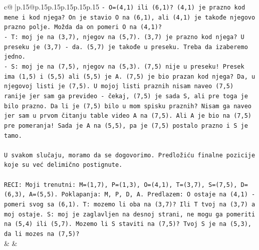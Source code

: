 \documentclass{article}
\begin{document}
{\begin{supertabular}{c@{$\;$}|p{.15\linewidth}@{}p{.15\linewidth}p{.15\linewidth}p{.15\linewidth}p{.15\linewidth}p{.15\linewidth}}
{{{\texttt{{-} O=(4,1) ili (6,1)? (4,1) je prazno kod mene i kod njega? On je stavio O na (6,1), ali (4,1) je takođe njegovo prazno polje. Možda da on pomeri O na (4,1)?} \\
\texttt{{-} T: moj je na (3,7), njegov na (5,7). (3,7) je prazno kod njega? U preseku je (3,7) {-} da. (5,7) je takođe u preseku. Treba da izaberemo jedno.} \\
\texttt{{-} S: moj je na (7,5), njegov na (5,3). (7,5) nije u preseku! Presek ima (1,5) i (5,5) ali (5,5) je A. (7,5) je bio prazan kod njega? Da, u njegovoj listi je (7,5). U mojoj listi praznih nisam naveo (7,5) ranije jer sam ga prevideo {-} čekaj, (7,5) je sada S, ali pre toga je bilo prazno. Da li je (7,5) bilo u mom spisku praznih? Nisam ga naveo jer sam u prvom čitanju table video A na (7,5). Ali A je bio na (7,5) pre pomeranja! Sada je A na (5,5), pa je (7,5) postalo prazno i S je tamo.} \\
\\ 
\texttt{U svakom slučaju, moramo da se dogovorimo. Predložiću finalne pozicije koje su već delimično postignute.} \\
\\ 
\texttt{RECI: Moji trenutni: M=(1,7), P=(1,3), O=(4,1), T=(3,7), S=(7,5), D=(6,3), A=(5,5). Poklapanja: M, P, D, A. Predlazem: O ostaje na (4,1) {-} pomeri svog sa (6,1). T: mozemo li oba na (3,7)? Ili T tvoj na (3,7) a moj ostaje. S: moj je zaglavljen na desnoj strani, ne mogu ga pomeriti na (5,4) ili (5,7). Mozemo li S staviti na (7,5)? Tvoj S je na (5,3), da li mozes na (7,5)?} \\
            }
        }
    }
    & & \\ \\


\end{supertabular}}
\end{document}
